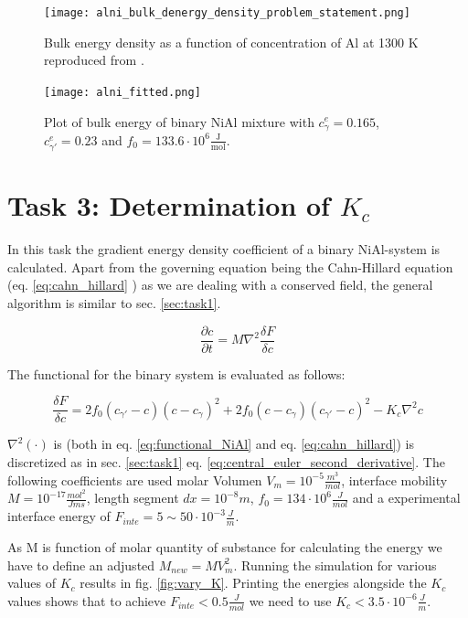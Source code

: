 \begin{figure}[htb]
	\centering\texttt{[image: alni\_bulk\_denergy\_density\_problem\_statement.png]}
	\caption{Bulk energy density as a function of concentration of Al at 1300 K reproduced from \cite{zaisera}.}
	\label{fig:AlNi_problem_statement}
\end{figure}

\begin{figure}[htb]
	\centering
	\texttt{[image: alni\_fitted.png]}
	\caption{Plot of bulk energy of binary NiAl mixture with \(c_{\gamma}^{e} = 0.165\),  \(c_{\gamma '}^{e} = 0.23\) and \(f_{0} = 133.6 \cdot 10^{6} \frac{\mathrm{J}}{\mathrm{mol}} \).}
	\label{fig:alni_fitted}
\end{figure}



\section{Task 3: Determination of \(K_{c}\) }
In this task the gradient energy density coefficient of a binary NiAl-system is calculated. Apart from the governing equation being the Cahn-Hillard equation (eq. \ref{eq:cahn_hillard} ) as we are dealing with a conserved field, the general algorithm is similar to sec. \ref{sec:task1}. 

\begin{equation}
	\frac{ \partial c}{ \partial t} = M \nabla^{2} \frac{\delta F}{\delta c} \label{eq:cahn_hillard}
\end{equation} 

The functional for the binary system is evaluated as follows:

\begin{equation}
	\frac{\delta F}{\delta c} = 2 f_{0}(c_{\gamma '} - c )(c - c_{\gamma})^2 + 2 f_{0} (c - c_{\gamma})(c_{\gamma '} - c )^{2} - K_{c} \nabla^{2} c  \label{eq:functional_NiAl}
\end{equation}
		
\(\nabla^{2}(\cdot)\) is (both in eq. \ref{eq:functional_NiAl} and eq. \ref{eq:cahn_hillard}) is discretized as in sec. \ref{sec:task1} eq. \ref{eq:central_euler_second_derivative}.  The following coefficients are used molar Volumen \(V_{m} = 10^{-5} \frac{m^{3}}{mol}\), interface mobility \(M = 10^{-17} \frac{mol^{2}}{J m s}\), length segment \(dx = 10^{-8} m\), \(f_{0} = 134 \cdot 10^{6} \frac{J}{mol}\) and a experimental interface energy of \( F_{inte} = 5 \sim 50 \cdot 10^{-3} \frac{J}{m}\). 

As M is function of molar quantity of substance for calculating the energy we have to define an adjusted \( M_{new} = M V_{m}^{2}\). Running the simulation for various values of \(K_{c}\) results in fig. \ref{fig:vary_K}. Printing the energies alongside the \(K_{c}\) values shows that to achieve \(F_{inte} < 0.5 \frac{J}{mol}\) we need to use \(K_{c} < 3.5 \cdot 10^{-6} \frac{J}{m}\).

